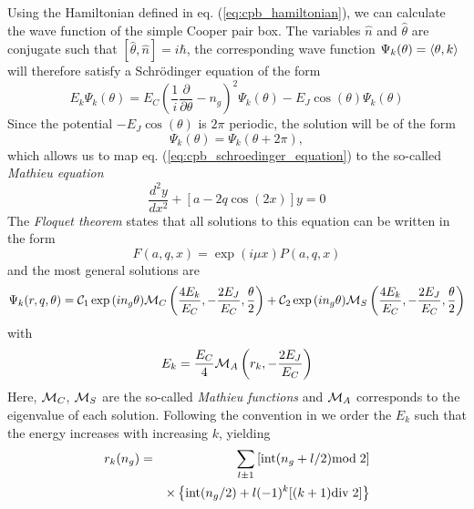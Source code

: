 Using the Hamiltonian defined in eq. (\ref{eq:cpb_hamiltonian}), we can calculate the wave function of the simple Cooper pair box. The variables $\hat{n}$ and $\hat{\theta}$ are conjugate such that $[\hat{\theta},\hat{n}]=i\hbar$, the corresponding wave function $\Psi_k(\theta) = \left< \theta,k \right>$ will therefore satisfy a Schrödinger equation of the form
%
\begin{equation}
E_k \Psi_k(\theta) = E_C(\frac{1}{i}\frac{\partial}{\partial \theta}-n_g)^2 \Psi_k(\theta) - E_J \cos{\left(\theta\right)}\Psi_k(\theta) \label{eq:cpb_schroedinger_equation}
\end{equation}
%
Since the potential $-E_J\cos{(\theta)}$ is $2\pi$ periodic, the solution will be of the form
%
\begin{equation}
\Psi_k(\theta) = \Psi_k(\theta+2\pi),
\end{equation}
%
which allows us to map eq. (\ref{eq:cpb_schroedinger_equation}) to the so-called {\it Mathieu  equation}
%
\begin{equation}
\frac{d^2y}{dx^2}+\left[a-2q\cos{(2x)}\right]y = 0
\end{equation}
%
The {\it Floquet theorem} states that all solutions to this equation can be written in the form
%
\begin{equation}
F(a,q,x) = \exp{\left(i\mu x\right)}P(a,q,x)
\end{equation}
%
and the most general solutions are\citep{cottet_implementation_2002}
%
\begin{equation}
\Psi_k(r,q,\theta) = \mcal{C}_1\exp{\left(i n_g \theta \right)}\mcal{M}_C\left(\frac{4E_k}{E_C},-\frac{2E_J}{E_C},\frac{\theta}{2}\right)+\mcal{C}_2\exp{\left(i n_g \theta \right)}\mcal{M}_S \left(\frac{4 E_k}{E_C},-\frac{2 E_J}{E_C},\frac{\theta}{2}\right)
\end{equation}
%
with 
%
\begin{equation}
E_k = \frac{E_C}{4}\mcal{M}_A \left(r_k,-\frac{2 E_J}{E_C} \right)
\end{equation}
%
Here, $\mcal{M}_C$, $\mcal{M}_S$ are the so-called {\it Mathieu functions} and $\mcal{M}_A$ corresponds to the eigenvalue of each solution. Following the convention in \citep{cottet_implementation_2002} we order the $E_k$ such that the energy increases with increasing $k$, yielding \citep{koch_charge-insensitive_2007}
%
\begin{eqnarray}
r_k(n_g) & = & \sum\limits_{l\pm 1}\left[\mathrm{int}(n_g+l/2)\mathrm{mod}\;2\right] \notag \\
&  & \times\left\{\mathrm{int}(n_g/2)+l(-1)^k[(k+1)\mathrm{div}\;2]\right\}
\end{eqnarray}
%

